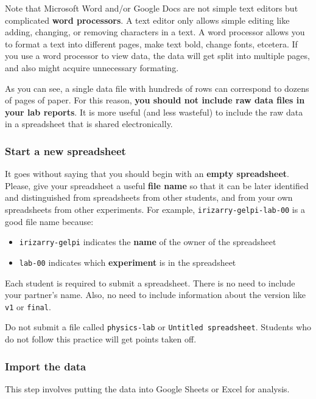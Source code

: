 Note that Microsoft Word and/or Google Docs are not simple text editors but complicated \textbf{word processors}. A text editor only allows simple editing like adding, changing, or removing characters in a text. A word processor allows you to format a text into different pages, make text bold, change fonts, etcetera. If you use a word processor to view data, the data will get split into multiple pages, and also might acquire unnecessary formating.

As you can see, a single data file with hundreds of rows can correspond to dozens of pages of paper. For this reason, \textbf{you should not include raw data files in your lab reports}. It is more useful (and less wasteful) to include the raw data in a spreadsheet that is shared electronically.
\subsubsection{Start a new spreadsheet}
It goes without saying that you should begin with an \textbf{empty spreadsheet}. Please, give your spreadsheet a useful \textbf{file name} so that it can be later identified and distinguished from spreadsheets from other students, and from your own spreadsheets from other experiments. For example, \texttt{irizarry-gelpi-lab-00} is a good file name because:
\begin{itemize}
    \item \texttt{irizarry-gelpi} indicates the \textbf{name} of the owner of the spreadsheet
    \item \texttt{lab-00} indicates which \textbf{experiment} is in the spreadsheet
\end{itemize}
Each student is required to submit a spreadsheet. There is no need to include your partner's name. Also, no need to include information about the version like \texttt{v1} or \texttt{final}.

Do not submit a file called \texttt{physics-lab} or \texttt{Untitled spreadsheet}. Students who do not follow this practice will get points taken off.
\subsubsection{Import the data}
This step involves putting the data into Google Sheets or Excel for analysis.

